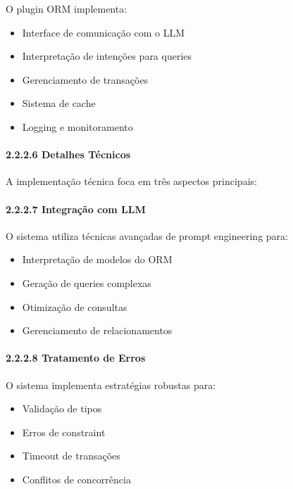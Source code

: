 \documentclass[
]{article}
\providecommand{\tightlist}{%
  \setlength{\itemsep}{0pt}\setlength{\parskip}{0pt}}
\begin{document}
O plugin ORM implementa:

\begin{itemize}
\tightlist
\item
  Interface de comunicação com o LLM
\item
  Interpretação de intenções para queries
\item
  Gerenciamento de transações
\item
  Sistema de cache
\item
  Logging e monitoramento
\end{itemize}

\paragraph{2.2.2.6 Detalhes Técnicos}\label{detalhes-tuxe9cnicos}

A implementação técnica foca em três aspectos principais:

\paragraph{2.2.2.7 Integração com LLM}\label{integrauxe7uxe3o-com-llm}

O sistema utiliza técnicas avançadas de prompt engineering para:

\begin{itemize}
\tightlist
\item
  Interpretação de modelos do ORM
\item
  Geração de queries complexas
\item
  Otimização de consultas
\item
  Gerenciamento de relacionamentos
\end{itemize}

\paragraph{2.2.2.8 Tratamento de Erros}\label{tratamento-de-erros}

O sistema implementa estratégias robustas para:

\begin{itemize}
\tightlist
\item
  Validação de tipos
\item
  Erros de constraint
\item
  Timeout de transações
\item
  Conflitos de concorrência
\end{itemize}
\end{document}
